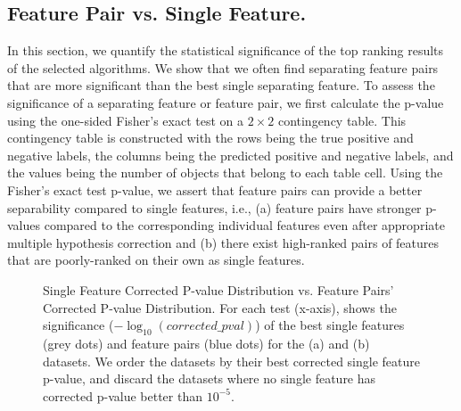 \subsection{Feature Pair vs. Single Feature.}\label{sec:FPvSF}

In this section, we quantify the statistical significance of the top ranking results of the selected algorithms. We show that we often find separating feature pairs that are more significant than the best single separating feature. To assess the significance of a separating feature or feature pair, we first calculate the p-value using the one-sided Fisher's exact test on a $2\times2$ contingency table. This contingency table is constructed with the rows being the true positive and negative labels, the columns being the predicted positive and negative labels, and the values being the number of objects that belong to each table cell. Using the Fisher's exact test p-value, we assert that feature pairs can provide a better separability compared to single features, i.e., (a) feature pairs have stronger p-values compared to the corresponding individual features even after appropriate multiple hypothesis correction and (b) there exist high-ranked pairs of features that are poorly-ranked on their own as single features.

\begin{figure}[h]
\centering %
\vspace{-2mm}
\vspace{-5mm}
\caption{Single Feature Corrected P-value Distribution vs. Feature Pairs' Corrected P-value Distribution. For each test (x-axis), shows the significance ($-\log_{10} (corrected\_pval)$) of the \tophundred best single features (grey dots) and feature pairs (blue dots) for the (a) \msig and (b) \lincs datasets. We order the datasets by their best corrected single feature p-value, and discard the datasets where no single feature has corrected p-value better than $10^{-5}$.}
\vspace{-5mm}
\label{fig:SF_FP}
\end{figure}

